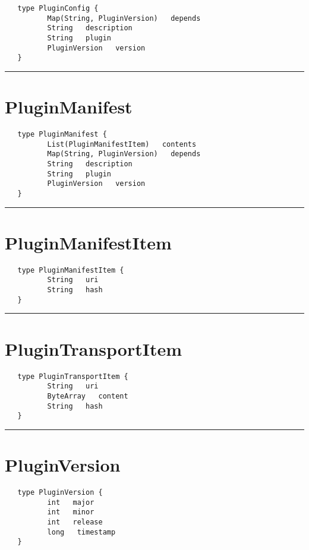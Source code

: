 \begin{verbatim}
   type PluginConfig {
          Map(String, PluginVersion)   depends
          String   description
          String   plugin
          PluginVersion   version
   }
\end{verbatim}

\rule{12cm}{2pt}
\section{PluginManifest}
\label{type:PluginManifest}

\begin{verbatim}
   type PluginManifest {
          List(PluginManifestItem)   contents
          Map(String, PluginVersion)   depends
          String   description
          String   plugin
          PluginVersion   version
   }
\end{verbatim}

\rule{12cm}{2pt}
\section{PluginManifestItem}
\label{type:PluginManifestItem}

\begin{verbatim}
   type PluginManifestItem {
          String   uri
          String   hash
   }
\end{verbatim}

\rule{12cm}{2pt}
\section{PluginTransportItem}
\label{type:PluginTransportItem}

\begin{verbatim}
   type PluginTransportItem {
          String   uri
          ByteArray   content
          String   hash
   }
\end{verbatim}

\rule{12cm}{2pt}
\section{PluginVersion}
\label{type:PluginVersion}

\begin{verbatim}
   type PluginVersion {
          int   major
          int   minor
          int   release
          long   timestamp
   }
\end{verbatim}

